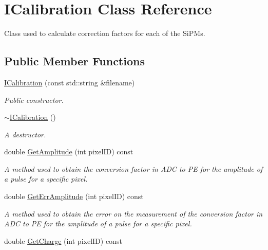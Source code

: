 \hypertarget{classICalibration}{}\section{I\+Calibration Class Reference}
\label{classICalibration}


Class used to calculate correction factors for each of the Si\+P\+Ms.  


\subsection*{Public Member Functions}
\begin{DoxyCompactItemize}
\item 
\hyperlink{classICalibration_a8ffdb45c17889268d414d456f05aa18b}{I\+Calibration} (const std\+::string \&filename)
\begin{DoxyCompactList}\small\item\em Public constructor. \end{DoxyCompactList}\item 
\mbox{\label{classICalibration_a80bc6211630a34579171d9de6e923fdf}} 
\hyperlink{classICalibration_a80bc6211630a34579171d9de6e923fdf}{$\sim$\+I\+Calibration} ()
\begin{DoxyCompactList}\small\item\em A destructor. \end{DoxyCompactList}\item 
double \hyperlink{classICalibration_a608320bee8a2e8c3d7442948e9de619a}{Get\+Amplitude} (int pixel\+ID) const
\begin{DoxyCompactList}\small\item\em A method used to obtain the conversion factor in A\+DC to PE for the amplitude of a pulse for a specific pixel. \end{DoxyCompactList}\item 
double \hyperlink{classICalibration_a4a6789b63abdee20d8b294e8a235cd7b}{Get\+Err\+Amplitude} (int pixel\+ID) const
\begin{DoxyCompactList}\small\item\em A method used to obtain the error on the measurement of the conversion factor in A\+DC to PE for the amplitude of a pulse for a specific pixel. \end{DoxyCompactList}\item 
double \hyperlink{classICalibration_a8f875ad909694df49d4cae6497f243e6}{Get\+Charge} (int pixel\+ID) const

\end{DoxyCompactItemize}
